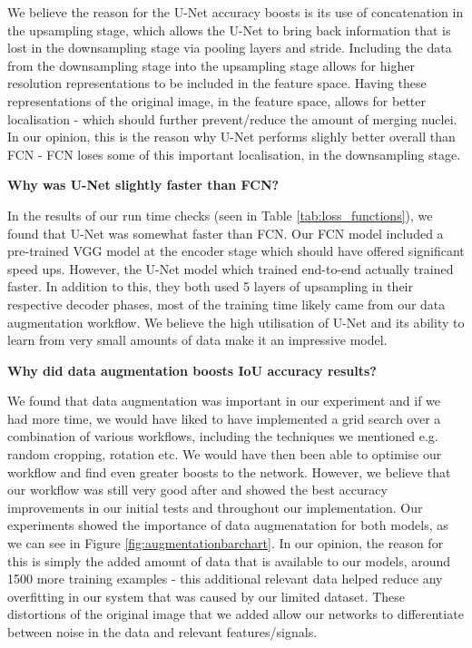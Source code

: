 \documentclass{article}
\begin{document}
We believe the reason for the U-Net accuracy boosts is its use of concatenation in the upsampling stage, which allows the U-Net to bring back information that is lost in the downsampling stage via pooling layers and stride. Including the data from the downsampling stage into the upsampling stage allows for higher resolution representations to be included in the feature space. Having these representations of the original image, in the feature space, allows for better localisation - which should further prevent/reduce the amount of merging nuclei. In our opinion, this is the reason why U-Net performs slighly better overall than FCN - FCN loses some of this important localisation, in the downsampling stage. 

\textbf{Why was U-Net slightly faster than FCN?}

In the results of our run time checks (seen in Table \ref{tab:loss_functions}), we found that U-Net was somewhat faster than FCN. Our FCN model included a pre-trained VGG model at the encoder stage which should have offered significant speed ups. However, the U-Net model which trained end-to-end actually trained faster. In addition to this, they both used 5 layers of upsampling in their respective decoder phases, most of the training time likely came from our data augmentation workflow. We believe the high utilisation of U-Net and its ability to learn from very small amounts of data make it an impressive model.

\textbf{Why did data augmentation boosts IoU accuracy results?}

We found that data augmentation was important in our experiment and if we had more time, we would have liked to have implemented a grid search over a combination of various workflows, including the techniques we mentioned e.g. random cropping, rotation etc. We would have then been able to optimise our workflow and find even greater boosts to the network. However, we believe that our workflow was still very good after and showed the best accuracy improvements in our initial tests and throughout our implementation. Our experiments showed the importance of data augmenatation for both models, as we can see in Figure \ref{fig:augmentationbarchart}. In our opinion, the reason for this is simply the added amount of data that is available to our models, around 1500 more training examples - this additional relevant data helped reduce any overfitting in our system that was caused by our limited dataset. These distortions of the original image that we added allow our networks to differentiate between noise in the data and relevant features/signals.
\end{document}
